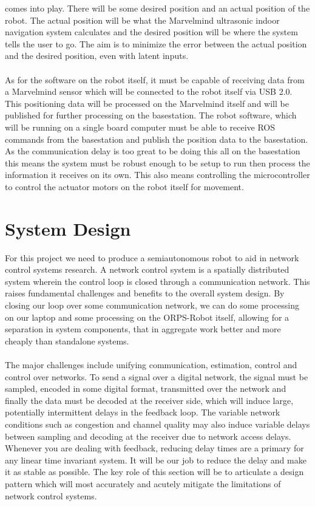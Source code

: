 \documentclass[english,12pt]{article}
\begin{document}
comes into play. There will be some desired position and an actual position of the robot. The actual
position will be what the Marvelmind ultrasonic indoor navigation system calculates and the desired
position will be where the system tells the user to go. The aim is to minimize the error between the
actual position and the desired position, even with latent inputs.\\\\
As for the software on the robot itself, it must be capable of receiving data from a Marvelmind sensor
which will be connected to the robot itself via USB 2.0. This positioning data will be processed on the
Marvelmind itself and will be published for further processing on the basestation. The robot software,
which will be running on a single board computer must be able to receive ROS commands from the basestation
and publish the position data to the basestation. As the communication delay is too great to be doing
this all on the basestation this means the system must be robust enough to be setup to run then process
the information it receives on its own. This also means controlling the microcontroller to
control the actuator motors on the robot itself for movement.
\section{System Design}
For this project we need to produce a semiautonomous robot to aid in network control systems
research. A network control system is a spatially distributed system wherein the control loop is closed
through a communication network. This raises fundamental challenges and benefits to the overall 
system design. By closing our loop over some communication network, we can do some processing on
our laptop and some processing on the ORPS-Robot itself, allowing for a separation in system
components, that in aggregate work better and more cheaply than standalone systems.\\\\ 
The major challenges include unifying communication, estimation, control and control over networks. To send a
signal over a digital network, the signal must be sampled, encoded in some digital format, transmitted
over the network and finally the data must be decoded at the receiver side, which will induce large,
potentially intermittent delays in the feedback loop. The variable network conditions such as congestion
and channel quality may also induce variable delays between sampling and decoding at the receiver due
to network access delays. Whenever you are dealing with feedback, reducing delay times are a primary
for any linear time invariant system. It will be our job to reduce the delay and make it as stable as
possible. The key role of this section will be to articulate a design pattern which will most accurately and
acutely mitigate the limitations of network control systems.
\end{document}

